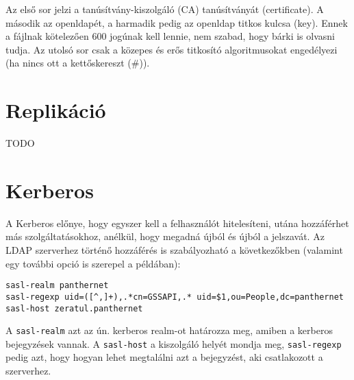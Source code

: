 Az első sor jelzi a tanúsítvány-kiszolgáló (CA) tanúsítványát (certificate). A második az openldapét, a harmadik pedig
az openldap titkos kulcsa (key). Ennek a fájlnak kötelezően 600 jogúnak kell lennie, nem szabad, hogy bárki is olvasni
tudja. Az utolsó sor csak a közepes és erős titkosító algoritmusokat engedélyezi (ha nincs ott a kettőskereszt (\#)).


\section{Replikáció}

TODO

\section{Kerberos}

A Kerberos előnye, hogy egyszer kell a felhasználót hitelesíteni, utána hozzáférhet más szolgáltatásokhoz, anélkül, hogy
megadná újból és újból a jelszavát. Az LDAP szerverhez történő hozzáférés is szabályozható a következőkben (valamint egy
további opció is szerepel a példában):

\begin{Verbatim}[frame=single]
sasl-realm panthernet
sasl-regexp uid=([^,]+),.*cn=GSSAPI,.* uid=$1,ou=People,dc=panthernet
sasl-host zeratul.panthernet
\end{Verbatim}

A \texttt{sasl-realm} azt az ún. kerberos realm-ot határozza meg, amiben a kerberos bejegyzések vannak. A
\texttt{sasl-host} a kiszolgáló helyét mondja meg, \texttt{sasl-regexp} pedig azt, hogy hogyan lehet megtalálni azt a
bejegyzést, aki csatlakozott a szerverhez.

